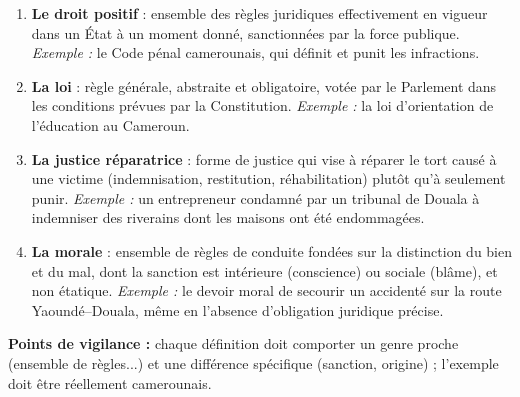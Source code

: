 \documentclass[11pt]{article}
\begin{document}
\begin{corrige}
\begin{enumerate}
\item \textbf{Le droit positif} : ensemble des règles juridiques effectivement en vigueur dans un État à un moment donné, sanctionnées par la force publique. \emph{Exemple :} le Code pénal camerounais, qui définit et punit les infractions.
\item \textbf{La loi} : règle générale, abstraite et obligatoire, votée par le Parlement dans les conditions prévues par la Constitution. \emph{Exemple :} la loi d'orientation de l'éducation au Cameroun.
\item \textbf{La justice réparatrice} : forme de justice qui vise à réparer le tort causé à une victime (indemnisation, restitution, réhabilitation) plutôt qu'à seulement punir. \emph{Exemple :} un entrepreneur condamné par un tribunal de Douala à indemniser des riverains dont les maisons ont été endommagées.
\item \textbf{La morale} : ensemble de règles de conduite fondées sur la distinction du bien et du mal, dont la sanction est intérieure (conscience) ou sociale (blâme), et non étatique. \emph{Exemple :} le devoir moral de secourir un accidenté sur la route Yaoundé--Douala, même en l'absence d'obligation juridique précise.
\end{enumerate}
\textbf{Points de vigilance :} chaque définition doit comporter un genre proche (ensemble de règles...) et une différence spécifique (sanction, origine) ; l'exemple doit être réellement camerounais.
\end{corrige}
\end{document}

